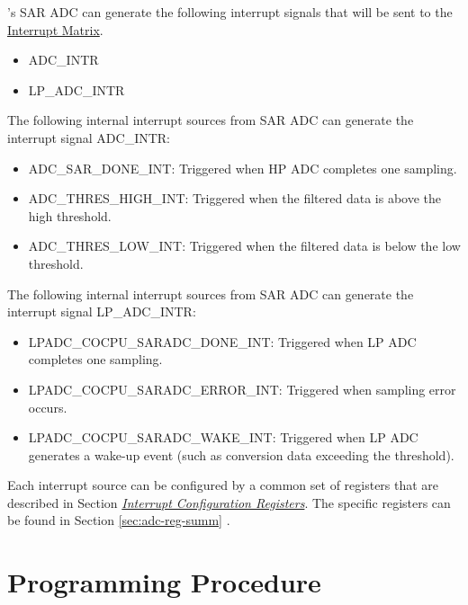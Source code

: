\documentclass[main\_\_EN.tex]{subfiles}
\begin{document}
\chipname{}'s SAR ADC can generate the following interrupt signals that will be sent to the \hyperref[mod:intmtrx]{Interrupt Matrix}.

   \begin{itemize}
        \item ADC\_INTR
        \item LP\_ADC\_INTR
    \end{itemize}

The following internal interrupt sources from SAR ADC can generate the interrupt signal ADC\_INTR:

\begin{itemize}
   \item \label{interreupt:ADCDONEINT1} ADC\_SAR\_DONE\_INT: Triggered when HP ADC completes one sampling.
   \item \label{interreupt:ADCTHRESxHIGHINT} ADC\_THRES\_HIGH\_INT: Triggered when the filtered data is above the high threshold.
   \item \label{interreupt:ADCTHRESxLOWINT} ADC\_THRES\_LOW\_INT: Triggered when the filtered data is below the low threshold.
\end{itemize}

The following internal interrupt sources from SAR ADC can generate the interrupt signal LP\_ADC\_INTR:

\begin{itemize}
   \item \label{interreupt:LPADCCOCPUSARADCxINT} LPADC\_COCPU\_SARADC\_DONE\_INT: Triggered when LP ADC completes one sampling.
   \item \label{interreupt:LPADCCOCPUSARADCxERRORINT} LPADC\_COCPU\_SARADC\_ERROR\_INT: Triggered when sampling error occurs.
   \item \label{interreupt:LPADCCOCPUSARADCxWAKEINT} LPADC\_COCPU\_SARADC\_WAKE\_INT: Triggered when LP ADC generates a wake-up event (such as conversion data exceeding the threshold).
\end{itemize}

Each interrupt source can be configured by a common set of registers that are described in Section \hyperref[interrupt-config-registers]{\textit{Interrupt Configuration Registers}}. The specific registers can be found in Section \ref{sec:adc-reg-summ} \textit{}.

\section{Programming Procedure}
\end{document}
